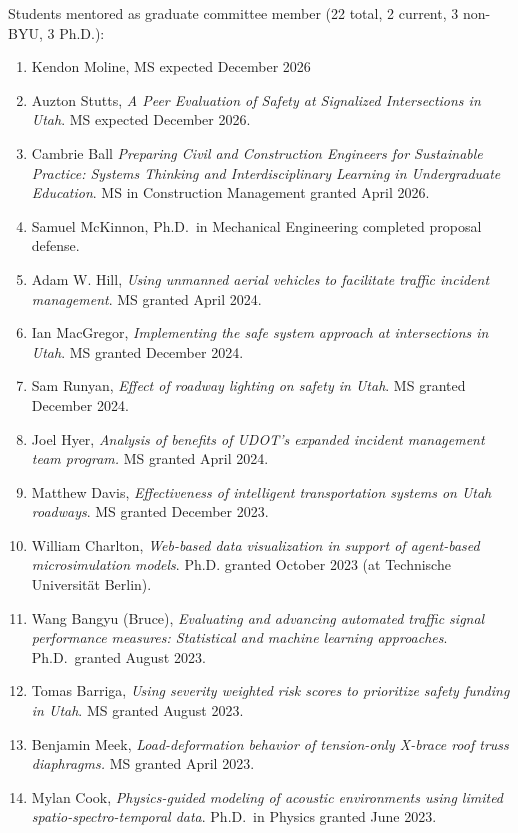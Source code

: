\documentclass[margin,line]{res}
\newif\ifdetail{}
\newcounter{enuminitialize}
\newenvironment{myenum}[1][]
{%
 \setcounter{enuminitialize}{#1}
 \addtocounter{enuminitialize}{2}
 \begin{enumerate}[left= 4pt, itemsep=8pt, start=\value{enuminitialize}, label=\arabic*\addtocounter{enumi}{-2}]
}
{%
 \end{enumerate}
}
\begin{document}
\begin{resume}
Students mentored as graduate committee member (22 total, 2 current, 3 non-BYU, 3 Ph.D.):
\vspace{0.3cm}
\begin{myenum}[24]
  \ifdetail {\color{NavyBlue} \fi
  \item Kendon Moline, MS expected December 2026
  \item Auzton Stutts, \textit{A Peer Evaluation of Safety at Signalized Intersections in Utah}. MS expected December 2026.
  \item Cambrie Ball \textit{Preparing Civil and Construction Engineers for Sustainable Practice: Systems Thinking and Interdisciplinary Learning in Undergraduate Education}. MS in Construction Management granted April 2026.
  \item Samuel McKinnon, Ph.D.\ in Mechanical Engineering completed proposal defense.
  \ifdetail } \fi
  \item Adam W. Hill, \textit{Using unmanned aerial vehicles to facilitate traffic incident management}. MS granted April 2024.
  \item Ian MacGregor, \textit{Implementing the safe system approach at intersections in Utah}. MS granted December 2024.
  \item Sam Runyan, \textit{ Effect of roadway lighting on safety in Utah}. MS granted December 2024.
  \item Joel Hyer, \textit{Analysis of benefits of UDOT's expanded incident management team program.} MS granted April 2024.
  \item Matthew Davis, \textit{Effectiveness of intelligent transportation systems on Utah roadways}. MS granted December 2023.
  \item William Charlton, \textit{Web-based data visualization in support of agent-based microsimulation models}. Ph.D. granted October 2023 (at Technische Universit\"at Berlin).
  \item Wang Bangyu (Bruce), \textit{Evaluating and advancing automated traffic signal performance measures: Statistical and machine learning approaches}. Ph.D.\ granted August 2023.
  \item Tomas Barriga, \textit{Using severity weighted risk scores to prioritize safety funding in Utah}. MS granted August 2023.
  \item Benjamin Meek, \textit{Load-deformation behavior of tension-only X-brace roof truss diaphragms.} MS granted April 2023.
  \item Mylan Cook, \textit{Physics-guided modeling of acoustic environments using limited spatio-spectro-temporal data}. Ph.D.\ in Physics granted June 2023.

\end{myenum}
\end{resume}
\end{document}
